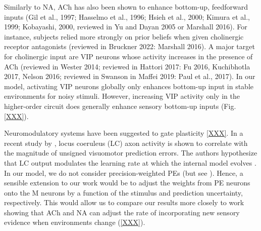 \documentclass[10pt,a4paper,draft]{article}
\begin{document}
Similarly to NA, ACh has also been shown to enhance bottom-up, feedforward inputs (Gil et al., 1997; Hasselmo et al., 1996; Hsieh et al., 2000; Kimura et al., 1999; Kobayashi, 2000, reviewed in Yu and Dayan 2005 or Marshall 2016). For instance, subjects relied more strongly on prior beliefs when given cholinergic receptor antagonists (reviewed in Bruckner 2022: Marshall 2016). A major target for cholinergic input are VIP neurons whose activity increases in the presence of ACh (reviewed in Wester 2014; reviewed in Hattori 2017: Fu 2016, Kuchibhotla 2017, Nelson 2016; reviewed in Swanson in Maffei 2019: Paul et al., 2017). In our model, activating VIP neurons globally only enhances bottom-up input in stable environments for noisy stimuli. However, increasing VIP activity only in the higher-order circuit does generally enhance sensory bottom-up inputs (Fig. \ref{XXX}).

Neuromodulatory systems have been suggested to gate plasticity \ref{XXX}. In a recent study by \citep{jordan2023locus}, locus coeruleus (LC) axon activity is shown to correlate with the magnitude of unsigned visuomotor prediction errors. The authors hypothesize that LC output modulates the learning rate at which the internal model evolves \citep{jordan2023locus}. In our model, we do not consider precision-weighted PEs (but see \citep{KathaXXX}). Hence, a sensible extension to our work would be to adjust the weights from PE neurons onto the M neurons by a function of the stimulus and prediction uncertainty, respectively. This would allow us to compare our results more closely to work showing that ACh and NA can adjust the rate of incorporating new sensory evidence when environments change (\ref{XXX}).


\end{document}
